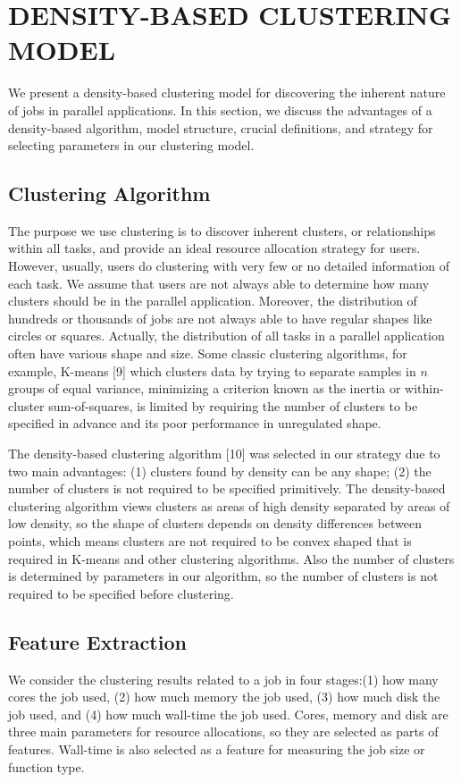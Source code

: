 \documentclass[conference]{IEEEtran}
\begin{document}
\section{DENSITY-BASED CLUSTERING MODEL}
We present a density-based clustering model for discovering the inherent nature of jobs in parallel applications. In this section, we discuss the advantages of a density-based algorithm, model structure, crucial definitions, and strategy for selecting parameters in our clustering model.

\subsection{Clustering Algorithm}
The purpose we use clustering is to discover inherent clusters, or relationships within all tasks, and provide an ideal resource allocation strategy for users. However, usually, users do clustering with very few or no detailed information of each task. We assume that users are not always able to determine how many clusters should be in the parallel application. Moreover, the distribution of hundreds or thousands of jobs are not always able to have regular shapes like circles or squares. Actually, the distribution of all tasks in a parallel application often have various shape and size. Some classic clustering algorithms, for example, K-means [9] which clusters data by trying to separate samples in $n$ groups of equal variance, minimizing a criterion known as the inertia or within-cluster sum-of-squares, is limited by requiring the number of clusters to be specified in advance and its poor performance in unregulated shape. 

The density-based clustering algorithm [10] was selected in our strategy due to two main advantages: (1) clusters found by density can be any shape; (2) the number of clusters is not required to be specified primitively. The density-based clustering algorithm views clusters as areas of high density separated by areas of low density, so the shape of clusters depends on density differences between points, which means clusters are not required to be convex shaped that is required in K-means and other clustering algorithms. Also the number of clusters is determined by parameters in our algorithm, so the number of clusters is not required to be specified before clustering.

\subsection{Feature Extraction} 
We consider the clustering results related to a job in four stages:(1) how many cores the job used, (2) how much memory the job used, (3) how much disk the job used, and (4) how much wall-time the job used. Cores, memory and disk are three main parameters for resource allocations, so they are selected as parts of features. Wall-time is also selected as a feature for measuring the job size or function type.
\end{document}
